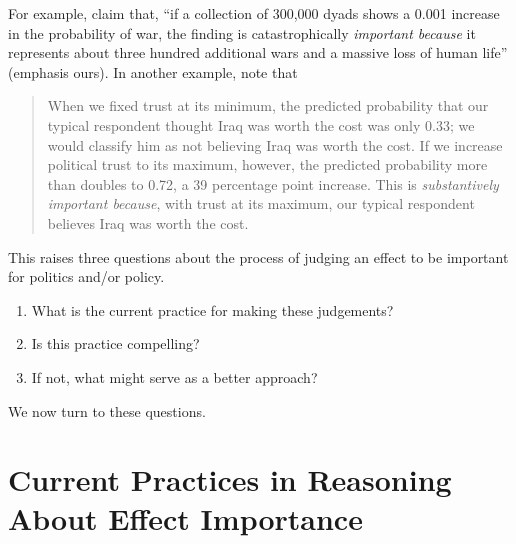 \documentclass[12pt]{article}
\begin{document}
For example, \citet[p. 711]{KingZeng2001} claim that, ``if a collection of 300,000 dyads shows a 0.001 increase in the probability of war, the finding is catastrophically \emph{important because} it represents about three hundred additional wars and a massive loss of human life'' (emphasis ours). In another example, \citet[p. 317]{HetheringtonSuhay2011} note that 
\begin{quote}
When we fixed trust at its minimum, the predicted probability that our typical respondent thought Iraq was worth the cost was only 0.33; we would classify him as not believing Iraq was worth the cost. If we increase political trust to its maximum, however, the predicted probability more than doubles to 0.72, a 39 percentage point increase. This is \emph{substantively important because}, with trust at its maximum, our typical respondent believes Iraq was worth the cost.
\end{quote}
This raises three questions about the process of judging an effect to be important for politics and/or policy.
\begin{enumerate}
\item What is the current practice for making these judgements?
\item Is this practice compelling?
\item If not, what might serve as a better approach?
\end{enumerate}
\noindent We now turn to these questions.

\section*{Current Practices in Reasoning About Effect Importance}



\end{document}
